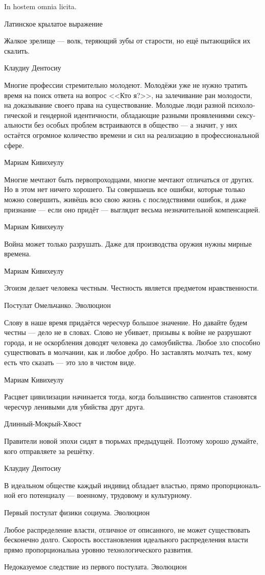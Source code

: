\documentclass[a4paper,12pt,fleqn]{book}\usepackage{polyglossia}\setdefaultlanguage[babelshorthands=true]{russian}\setotherlanguage{english}\defaultfontfeatures{Ligatures=TeX,Mapping=tex-text}\usepackage{xcolor}\newcommand{\ml}[3]{#2}
\begin{document}
{\epigraph
{In hostem omnia licita.}
{Латинское крылатое выражение}

\epigraph
{Жалкое зрелище --- волк, теряющий зубы от старости, но ещё пытающийся их скалить.}
{Клаудиу Дентосиу}

\epigraph
{Многие профессии стремительно молодеют.
Молодёжи уже не нужно тратить время на поиск ответа на вопрос <<Кто я?>>, на залечивание ран молодости, на доказывание своего права на существование.
Молодые люди разной психологической и гендерной идентичности, обладающие разными проявлениями сексуальности без особых проблем встраиваются в общество --- а значит, у них остаётся огромное количество времени и сил на реализацию в профессиональной сфере.}
{Мариам Кивихеулу}

\epigraph
{Многие мечтают быть первопроходцами, многие мечтают отличаться от других.
Но в этом нет ничего хорошего.
Ты совершаешь все ошибки, которые только можно совершить, живёшь всю свою жизнь с последствиями ошибок, и даже признание --- если оно придёт --- выглядит весьма незначительной компенсацией.}
{Мариам Кивихеулу}

\epigraph
{Война может только разрушать.
Даже для производства оружия нужны мирные времена.}
{Мариам Кивихеулу}

\epigraph
{Эгоизм делает человека честным.
Честность является предметом нравственности.}
{Постулат Омельчанко.
Эволюцион}

\epigraph
{Слову в наше время придаётся чересчур большое значение.
Но давайте будем честны --- дело не в словах.
Слово не убивает, призывы к войне не разрушают города,  и не оскорбления доводят человека до самоубийства.
Любое зло способно существовать в молчании, как и любое добро.
Но заставлять молчать тех, кому есть что сказать --- это зло в чистом виде.}
{Мариам Кивихеулу}

\epigraph
{Расцвет цивилизации начинается тогда, когда большинство сапиентов становятся чересчур ленивыми для убийства друг друга.}
{Длинный-Мокрый-Хвост}

\epigraph
{Правители новой эпохи сидят в тюрьмах предыдущей.
Поэтому хорошо думайте, кого отправляете за решётку.}
{Клаудиу Дентосиу}

\epigraph
{В идеальном обществе каждый индивид обладает властью, прямо пропорциональной его потенциалу --- военному, трудовому и культурному.}
{Первый постулат физики социума. Эволюцион}

\epigraph
{Любое распределение власти, отличное от описанного, не может существовать бесконечно долго.
Скорость восстановления идеального распределения власти прямо пропорциональна уровню технологического развития.}
{Недоказуемое следствие из первого постулата. Эволюцион}

}
\end{document}
